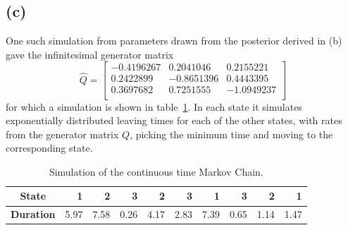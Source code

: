 \documentclass{article}
\begin{document}
\subsection{(c)}
One such simulation from parameters drawn from the posterior derived in (b)
gave the infinitesimal generator matrix
$$ \hat Q = \begin{bmatrix}
-0.4196267 & 0.2041046 & 0.2155221 \\
0.2422899 & -0.8651396 & 0.4443395 \\
0.3697682 & 0.7251555 & -1.0949237 \\
\end{bmatrix} $$
for which a simulation is shown in table~\ref{tab:2c_sim}.
In each state it simulates exponentially distributed leaving times
for each of the other states,
with rates from the generator matrix $Q$,
picking the minimum time and moving to the corresponding state.

\begin{table}
	\caption{Simulation of the continuous time Markov Chain. \label{tab:2c_sim}}
	\begin{tabular}{c|r|r|r|r|r|r|r|r|r}\toprule
		\textbf{State} & 1 & 2 & 3 & 2 & 3 & 1 & 3 & 2 & 1 \\ \midrule
		\textbf{Duration} & 5.97 & 7.58 & 0.26 & 4.17 & 2.83 & 7.39 & 0.65 & 1.14 & 1.47 \\ \bottomrule
	\end{tabular}
\end{table}

\end{document}
